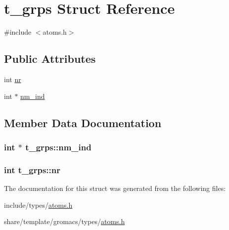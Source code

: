 \hypertarget{structt__grps}{\section{t\-\_\-grps \-Struct \-Reference}
\label{structt__grps}
}


{\ttfamily \#include $<$atoms.\-h$>$}

\subsection*{\-Public \-Attributes}
\begin{DoxyCompactItemize}
\item 
int \hyperlink{structt__grps_a2ad3c66dd36bf84d8e92b1b86604c8b2}{nr}
\item 
int $\ast$ \hyperlink{structt__grps_a800939497a0291ae001041f6534ebbe0}{nm\-\_\-ind}
\end{DoxyCompactItemize}


\subsection{\-Member \-Data \-Documentation}
\hypertarget{structt__grps_a800939497a0291ae001041f6534ebbe0}{
\subsubsection[{nm\-\_\-ind}]{\setlength{\rightskip}{0pt plus 5cm}int $\ast$ {\bf t\-\_\-grps\-::nm\-\_\-ind}}}\label{structt__grps_a800939497a0291ae001041f6534ebbe0}
\hypertarget{structt__grps_a2ad3c66dd36bf84d8e92b1b86604c8b2}{
\subsubsection[{nr}]{\setlength{\rightskip}{0pt plus 5cm}int {\bf t\-\_\-grps\-::nr}}}\label{structt__grps_a2ad3c66dd36bf84d8e92b1b86604c8b2}


\-The documentation for this struct was generated from the following files\-:\begin{DoxyCompactItemize}
\item 
include/types/\hyperlink{include_2types_2atoms_8h}{atoms.\-h}\item 
share/template/gromacs/types/\hyperlink{share_2template_2gromacs_2types_2atoms_8h}{atoms.\-h}\end{DoxyCompactItemize}
